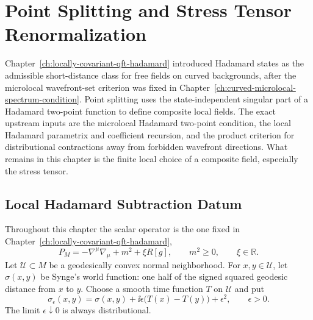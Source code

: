 \chapter{Point Splitting and Stress Tensor Renormalization}
\label{ch:point-splitting-stress-tensor-renormalization}

\ConventionsMixed

Chapter~\ref{ch:locally-covariant-qft-hadamard} introduced Hadamard states as
the admissible short-distance class for free fields on curved backgrounds,
after the microlocal wavefront-set criterion was fixed in
Chapter~\ref{ch:curved-microlocal-spectrum-condition}.  Point splitting uses
the state-independent singular part of a Hadamard two-point function to define
composite local fields.
The exact upstream inputs are the microlocal Hadamard two-point condition,
the local Hadamard parametrix and coefficient recursion, and the product
criterion for distributional contractions away from forbidden wavefront
directions.  What remains in this chapter is the finite local choice of a
composite field, especially the stress tensor.

\section{Local Hadamard Subtraction Datum}
\label{sec:point-splitting-local-hadamard-subtraction-datum}

Throughout this chapter the scalar operator is the one fixed in
Chapter~\ref{ch:locally-covariant-qft-hadamard},
\begin{equation}
  P_M=-\nabla^\mu\nabla_\mu+m^2+\xi R[g],
  \qquad m^2\ge0,\qquad \xi\in\mathbb R .
  \label{eq:point-splitting-kg-operator}
\end{equation}
Let \(\mathcal U\subset M\) be a geodesically convex normal neighborhood.
For \(x,y\in\mathcal U\), let \(\sigma(x,y)\) be Synge's world function:
one half of the signed squared geodesic distance from \(x\) to \(y\).  Choose
a smooth time function \(T\) on \(\mathcal U\) and put
\begin{equation}
  \sigma_\epsilon(x,y)
  =
  \sigma(x,y)+\ii\epsilon\bigl(T(x)-T(y)\bigr)+\epsilon^2,
  \qquad \epsilon>0 .
  \label{eq:point-splitting-sigma-epsilon}
\end{equation}
The limit \(\epsilon\downarrow0\) is always distributional.

